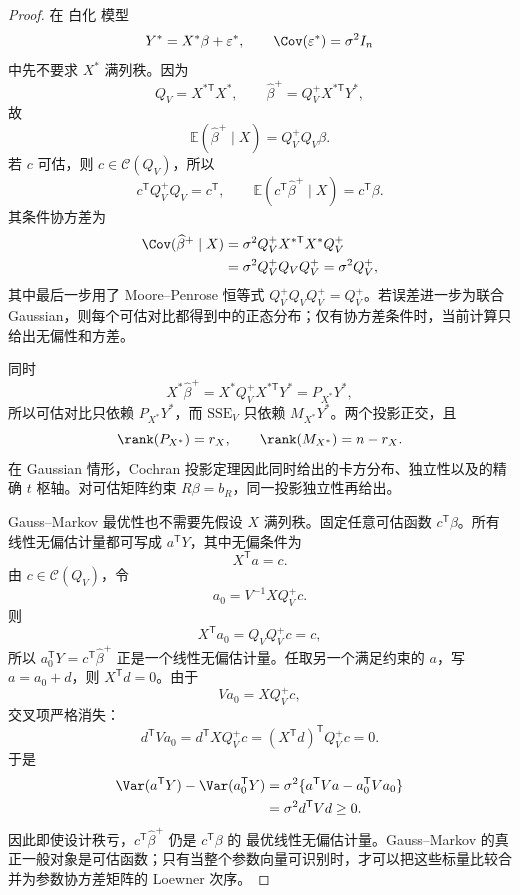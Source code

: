\begin{proof}
在 白化 模型
\[
 Y^*=X^*\beta+\varepsilon^*,
 \qquad
 \Cov(\varepsilon^*)=\sigma^2I_n
\]
中先不要求 $X^*$ 满列秩。因为
\[
 Q_V=X^{*\mathsf T}X^*,
 \qquad
 \widehat\beta^+=Q_V^+X^{*\mathsf T}Y^*,
\]
故
\[
 \mathbb E(\widehat\beta^+\mid X)
 =Q_V^+Q_V\beta.
\]
若 $c$ 可估，则 $c\in\mathcal C(Q_V)$，所以
\[
 c^{\mathsf T}Q_V^+Q_V=c^{\mathsf T},
 \qquad
 \mathbb E(c^{\mathsf T}\widehat\beta^+\mid X)=c^{\mathsf T}\beta.
\]
其条件协方差为
\begin{align*}
 \Cov(\widehat\beta^+\mid X)
 &=\sigma^2Q_V^+X^{*\mathsf T}X^*Q_V^+\\
 &=\sigma^2Q_V^+Q_VQ_V^+
 =\sigma^2Q_V^+,
\end{align*}
其中最后一步用了 Moore--Penrose 恒等式 $Q_V^+Q_VQ_V^+=Q_V^+$。若误差进一步为联合 Gaussian，则每个可估对比都得到中的正态分布；仅有协方差条件时，当前计算只给出无偏性和方差。

同时
\[
 X^*\widehat\beta^+
 =X^*Q_V^+X^{*\mathsf T}Y^*
 =P_{X^*}Y^*,
\]
所以可估对比只依赖 $P_{X^*}Y^*$，而 $\mathrm{SSE}_V$ 只依赖 $M_{X^*}Y^*$。两个投影正交，且
\[
 \rank(P_{X^*})=r_X,
 \qquad
 \rank(M_{X^*})=n-r_X.
\]
在 Gaussian 情形，Cochran 投影定理因此同时给出的卡方分布、独立性以及的精确 $t$ 枢轴。对可估矩阵约束 $R\beta=b_R$，同一投影独立性再给出。

Gauss--Markov 最优性也不需要先假设 $X$ 满列秩。固定任意可估函数 $c^{\mathsf T}\beta$。所有线性无偏估计量都可写成 $a^{\mathsf T}Y$，其中无偏条件为
\[
 X^{\mathsf T}a=c.
\]
由 $c\in\mathcal C(Q_V)$，令
\[
 a_0=V^{-1}XQ_V^+c.
\]
则
\[
 X^{\mathsf T}a_0=Q_VQ_V^+c=c,
\]
所以 $a_0^{\mathsf T}Y=c^{\mathsf T}\widehat\beta^+$ 正是一个线性无偏估计量。任取另一个满足约束的 $a$，写 $a=a_0+d$，则 $X^{\mathsf T}d=0$。由于
\[
 Va_0=XQ_V^+c,
\]
交叉项严格消失：
\[
 d^{\mathsf T}Va_0
 =d^{\mathsf T}XQ_V^+c
 =(X^{\mathsf T}d)^{\mathsf T}Q_V^+c
 =0.
\]
于是
\begin{align*}
 \Var(a^{\mathsf T}Y)-\Var(a_0^{\mathsf T}Y)
 &=\sigma^2\{a^{\mathsf T}Va-a_0^{\mathsf T}Va_0\}\\
 &=\sigma^2d^{\mathsf T}Vd
 \ge 0.
\end{align*}
因此即使设计秩亏，$c^{\mathsf T}\widehat\beta^+$ 仍是 $c^{\mathsf T}\beta$ 的 最优线性无偏估计量。Gauss--Markov 的真正一般对象是可估函数；只有当整个参数向量可识别时，才可以把这些标量比较合并为参数协方差矩阵的 Loewner 次序。
\end{proof}


